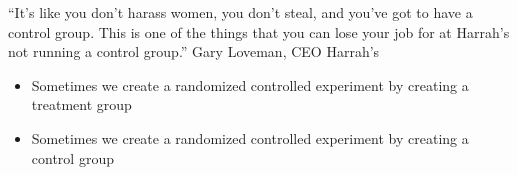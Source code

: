 \documentclass[aspectratio=169]{beamer}
\begin{document}
\begin{frame}

``It's like you don't harass women, you don't steal, and you've got to have a control group. This is one of the things that you can lose your job for at Harrah's not running a control group.''
Gary Loveman, CEO Harrah's

\pause
\begin{itemize}
\item Sometimes we create a randomized controlled experiment by creating a treatment group 
\item Sometimes we create a randomized controlled experiment by creating a control group
\end{itemize}

\end{frame}
\begin{frame}

\begin{center}
\end{center}

\end{frame}
\frame{\titlepage}
\end{document}

